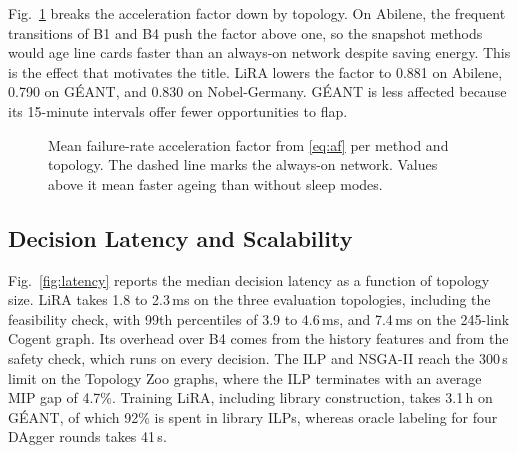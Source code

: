 \documentclass[conference]{IEEEtran}
\begin{document}
Fig.~\ref{fig:af} breaks the acceleration factor down by topology. On Abilene, the frequent transitions of B1 and B4 push the factor above one, so the snapshot methods would age line cards faster than an always-on network despite saving energy. This is the effect that motivates the title. LiRA lowers the factor to 0.881 on Abilene, 0.790 on G\'{E}ANT, and 0.830 on Nobel-Germany. G\'{E}ANT is less affected because its 15-minute intervals offer fewer opportunities to flap.

\begin{figure}[t]
\centering
{}
\caption{Mean failure-rate acceleration factor from \eqref{eq:af} per method and topology. The dashed line marks the always-on network. Values above it mean faster ageing than without sleep modes.}
\label{fig:af}
\end{figure}

\subsection{Decision Latency and Scalability}

Fig.~\ref{fig:latency} reports the median decision latency as a function of topology size. LiRA takes 1.8 to 2.3\,ms on the three evaluation topologies, including the feasibility check, with 99th percentiles of 3.9 to 4.6\,ms, and 7.4\,ms on the 245-link Cogent graph. Its overhead over B4 comes from the history features and from the safety check, which runs on every decision. The ILP and NSGA-II reach the 300\,s limit on the Topology Zoo graphs, where the ILP terminates with an average MIP gap of 4.7\%. Training LiRA, including library construction, takes 3.1\,h on G\'{E}ANT, of which 92\% is spent in library ILPs, whereas oracle labeling for four DAgger rounds takes 41\,s.
\end{document}
